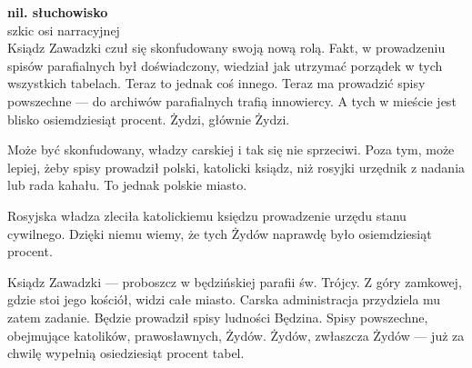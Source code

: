 \documentclass[11pt,a4paper,oneside]{article}
\begin{document}
\noindent
\textbf{nil. słuchowisko}\\
szkic osi narracyjnej
\\

\noindent
Ksiądz Zawadzki czuł się skonfudowany swoją nową rolą. Fakt,
w prowadzeniu spisów parafialnych był doświadczony, wiedział jak
utrzymać porządek w tych wszystkich tabelach. Teraz to jednak coś
innego. Teraz ma prowadzić spisy powszechne --- do archiwów
parafialnych trafią innowiercy. A tych w mieście jest blisko
osiemdziesiąt procent. Żydzi, głównie Żydzi. 

Może być skonfudowany, władzy carskiej i tak się nie sprzeciwi. Poza
tym, może lepiej, żeby spisy prowadził polski, katolicki ksiądz, niż
rosyjki urzędnik z nadania lub rada kahału. To jednak polskie miasto.

Rosyjska władza zleciła katolickiemu księdzu prowadzenie urzędu
stanu cywilnego. Dzięki niemu wiemy, że tych Żydów naprawdę było
osiemdziesiąt procent. 

\vspace{5em}
\noindent
Ksiądz Zawadzki --- proboszcz w będzińskiej parafii św. Trójcy.
Z góry zamkowej, gdzie stoi jego kościół, widzi całe miasto. 
Carska administracja przydziela mu zatem zadanie. Będzie 
prowadził spisy ludności Będzina. Spisy powszechne, obejmujące
katolików, prawosławnych, Żydów. Żydów, zwłaszcza Żydów ---
już za chwilę wypełnią osiedziesiąt procent tabel. 
\end{document}
